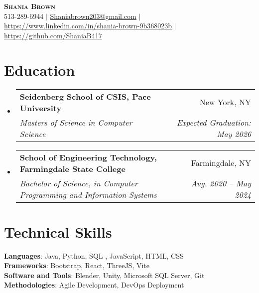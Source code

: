 \documentclass[letterpaper,11pt]{article}
\makeatletter
\newcommand{\resumeSubheading}[4]{
  \vspace{-2pt}\item
    \begin{tabular*}{0.97\textwidth}[t]{l@{\extracolsep{\fill}}r}
      \textbf{#1} & #2 \\
      \textit{\small#3} & \textit{\small #4} \\
    \end{tabular*}\vspace{-7pt}
}
\newcommand{\resumeSubHeadingListStart}{\begin{itemize}[leftmargin=0.15in, label={}]}
\newcommand{\resumeSubHeadingListEnd}{\end{itemize}}
\makeatother
\begin{document}

\begin{center}
    \textbf{\Huge \scshape Shania Brown} \\ \vspace{1pt}
    \small 513-289-6944 $|$ \href{mailto:x@x.com}{\underline{Shaniabrown203@gmail.com}} $|$ 
    \href{https://linkedin.com/in/...}{\underline{https://www.linkedin.com/in/shania-brown-9b368023b}} $|$
    \href{https://github.com/...}{\underline{https://github.com/ShaniaB417}}
\end{center}


\section{Education}
  \resumeSubHeadingListStart
    \resumeSubheading
      {Seidenberg School of CSIS, Pace University}{New York, NY}
      {Masters of Science in Computer Science}{Expected Graduation: May 2026}
    \resumeSubheading
      {School of Engineering Technology, Farmingdale State College }{Farmingdale, NY}
      {Bachelor of Science, in Computer Programming and Information Systems }{Aug. 2020 -- May 2024}
  \resumeSubHeadingListEnd



\section{Technical Skills}
 \begin{itemize}[leftmargin=0.15in, label={}]
    \small{\item{
     \textbf{Languages}{: Java, Python, SQL , JavaScript, HTML, CSS } \\
     \textbf{Frameworks}{: Bootstrap, React, ThreeJS, Vite } \\
     \textbf{Software and Tools}{: Blender, Unity, Microsoft SQL Server, Git } \\
     \textbf{Methodologies}{: Agile Development, DevOps Deployment}
    }}
 \end{itemize}
\end{document}
